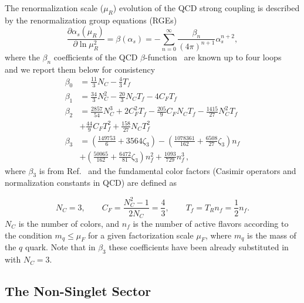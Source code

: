 \documentclass[preprint,12pt]{elsarticle}
\newcommand{\ddp}{\partial}
\begin{document}
The renormalization scale ($\mu_R$) evolution of the QCD strong coupling is described by the renormalization group equations (RGEs)  
%
\begin{equation}
\frac{\ddp \alpha_s(\mu_R)}{\ddp \ln \mu_R^2} = \beta(\alpha_s) = -\sum_{n=0}^{\infty} \frac{\beta_n}{(4\pi)^{n+1}} \alpha_s^{n+2},
\label{eq:1-basics-betafn}
\end{equation}
%
where the $\beta_n$ coefficients of the QCD $\beta$-function~\cite{Gross:1973id,Politzer:1974fr}  are known up to four loops~\cite{vanRitbergen:1997va,Czakon:2004bu} and we report them below for consistency
%
\begin{align}
\beta_{0}  &= \frac{11}{3}N_{C}-\frac{4}{3}T_{f} \\
\beta_{1}  &=  \frac{34}{3}N_{C}^{2}-\frac{20}{3}N_{C}T_{f}-4C_{F}T_{f}   
\\
\beta_{2}  &= 
\frac{2857}{54}N_{C}^{3}+2C_{F}^{2}T_{f}-\frac{205}{9}C_{F}N_{C}T_{f}-\frac{1415}{27}N_{C}^{2}T_{f} \nonumber\\
&+\frac{44}{9}C_{F}T_{f}^{2}+\frac{158}{27}N_{C}T_{f}^{2} 
\\
\beta_3 &=   \left( \frac{149753}{6} + 3564 \zeta_3 \right)
        - \left( \frac{1078361}{162} + \frac{6508}{27} \zeta_3 \right) n_f
  \nonumber \\ 
       &+ \left( \frac{50065}{162} + \frac{6472}{81} \zeta_3 \right) n_f^2
       +  \frac{1093}{729}  n_f^3\,,
\label{eq:beta3}
\end{align}
%
where $\beta_3$ is from Ref.~\cite{vanRitbergen:1997va} and the
fundamental color factors (Casimir operators and normalization constants in QCD) are defined as

\begin{equation}
N_{C}=3,\qquad C_{F}=\frac{N_{C}^{2}-1}{2N_{C}}=\frac{4}{3},\qquad
T_{f}=T_{R}n_{f}=\frac{1}{2}n_{f}.
\end{equation}
$N_{C}$ is the number of colors, and $n_{f}$ is the number of active flavors according to the condition $m_{q}\leq \mu_F$ for a given factorization scale
$\mu_F$, where $m_q$ is the mass of the $q$ quark. Note that in $\beta_3$ these coefficients have been already substituted in with $N_C=3$. 

\subsection{The Non-Singlet Sector}
\label{subsec:ns-sector}
\end{document}
